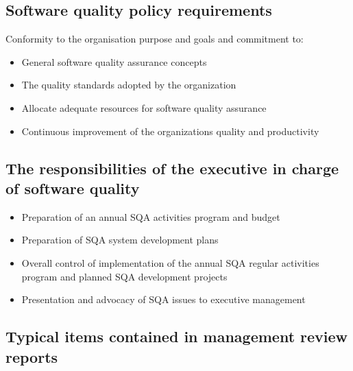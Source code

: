 \documentclass{article}
\begin{document}
\subsection{Software quality policy requirements}

\begin{flushleft}
Conformity to the organisation purpose and goals and commitment to:
\begin{itemize}
  \item General software quality assurance concepts
  \item The quality standards adopted by the organization
  \item Allocate adequate resources for software quality assurance
  \item Continuous improvement of the organizations quality and productivity
\end{itemize}
\end{flushleft}

\subsection{The responsibilities of the executive in charge of software quality}

\begin{itemize}
  \item Preparation of an annual SQA activities program and budget
  \item Preparation of SQA system development plans
  \item Overall control of implementation of the annual SQA regular activities program and planned SQA development projects
  \item Presentation and advocacy of SQA issues to executive management
\end{itemize}

\subsection{Typical items contained in management review reports}
\end{document}
